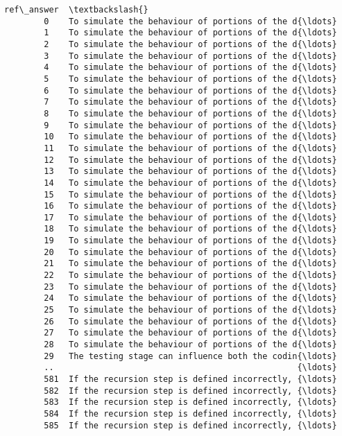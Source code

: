 \documentclass[11pt]{article}
\begin{document}
\begin{Verbatim}[commandchars=\\\{\}]
                                                    ref\_answer  \textbackslash{}
        0    To simulate the behaviour of portions of the d{\ldots}   
        1    To simulate the behaviour of portions of the d{\ldots}   
        2    To simulate the behaviour of portions of the d{\ldots}   
        3    To simulate the behaviour of portions of the d{\ldots}   
        4    To simulate the behaviour of portions of the d{\ldots}   
        5    To simulate the behaviour of portions of the d{\ldots}   
        6    To simulate the behaviour of portions of the d{\ldots}   
        7    To simulate the behaviour of portions of the d{\ldots}   
        8    To simulate the behaviour of portions of the d{\ldots}   
        9    To simulate the behaviour of portions of the d{\ldots}   
        10   To simulate the behaviour of portions of the d{\ldots}   
        11   To simulate the behaviour of portions of the d{\ldots}   
        12   To simulate the behaviour of portions of the d{\ldots}   
        13   To simulate the behaviour of portions of the d{\ldots}   
        14   To simulate the behaviour of portions of the d{\ldots}   
        15   To simulate the behaviour of portions of the d{\ldots}   
        16   To simulate the behaviour of portions of the d{\ldots}   
        17   To simulate the behaviour of portions of the d{\ldots}   
        18   To simulate the behaviour of portions of the d{\ldots}   
        19   To simulate the behaviour of portions of the d{\ldots}   
        20   To simulate the behaviour of portions of the d{\ldots}   
        21   To simulate the behaviour of portions of the d{\ldots}   
        22   To simulate the behaviour of portions of the d{\ldots}   
        23   To simulate the behaviour of portions of the d{\ldots}   
        24   To simulate the behaviour of portions of the d{\ldots}   
        25   To simulate the behaviour of portions of the d{\ldots}   
        26   To simulate the behaviour of portions of the d{\ldots}   
        27   To simulate the behaviour of portions of the d{\ldots}   
        28   To simulate the behaviour of portions of the d{\ldots}   
        29   The testing stage can influence both the codin{\ldots}   
        ..                                                 {\ldots}   
        581  If the recursion step is defined incorrectly, {\ldots}   
        582  If the recursion step is defined incorrectly, {\ldots}   
        583  If the recursion step is defined incorrectly, {\ldots}   
        584  If the recursion step is defined incorrectly, {\ldots}   
        585  If the recursion step is defined incorrectly, {\ldots}   

\end{Verbatim}
\end{document}
